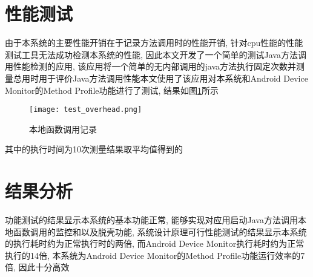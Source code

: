\section{性能测试}
由于本系统的主要性能开销在于记录方法调用时的性能开销, 针对cpu性能的性能测试工具无法成功检测本系统的性能, 因此本文开发了一个简单的测试Java方法调用性能检测的应用, 该应用将一个简单的无内部调用的java方法执行固定次数并测量总用时用于评价Java方法调用性能\juhao 本文使用了该应用对本系统和Android Device Monitor的Method Profile功能进行了测试, 结果如图\ref{testOverhead}所示\juhao 
\begin{figure}[ht]
	\centering
	\texttt{[image: test\_overhead.png]}
	\caption{本地函数调用记录}
	\label{testOverhead}
\end{figure}
其中的执行时间为10次测量结果取平均值得到的\juhao

\section{结果分析}
功能测试的结果显示本系统的基本功能正常, 能够实现对应用启动\dunhao Java方法调用\dunhao 本地函数调用的监控和以及脱壳功能, 系统设计原理可行\juhao 性能测试的结果显示本系统的执行耗时约为正常执行时的两倍, 而Android Device Monitor执行耗时约为正常执行的14倍, 本系统为Android Device Monitor的Method Profile功能运行效率的7倍, 因此十分高效\juhao 

